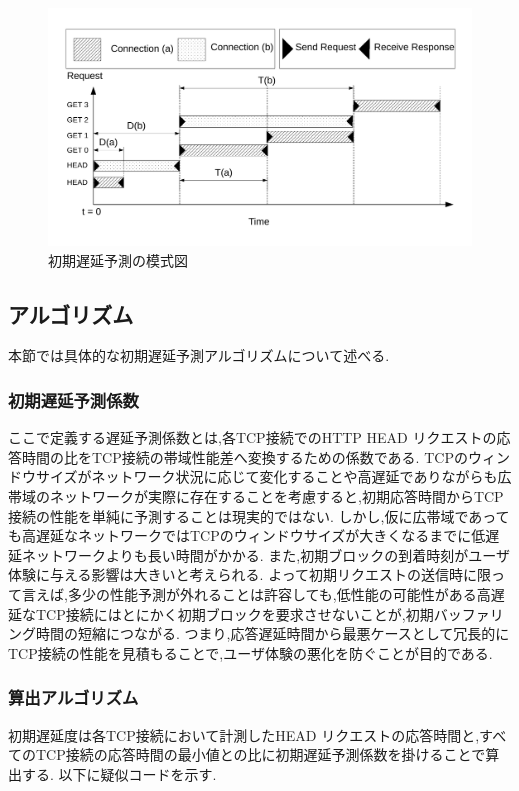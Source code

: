 \documentclass[a4j,12pt]{gradthesis_utf8}
\begin{document}
\begin{figure}[ht]
	\centering
	\includegraphics[width=14cm]{figure/head.pdf}
	\caption{初期遅延予測の模式図}
	\label{head}
\end{figure}

\newpage

\subsection{アルゴリズム}
\label{yosokuhouhou}
本節では具体的な初期遅延予測アルゴリズムについて述べる.

\subsubsection{初期遅延予測係数}
ここで定義する遅延予測係数とは,各TCP接続でのHTTP HEAD リクエストの応答時間の比をTCP接続の帯域性能差へ変換するための係数である.
TCPのウィンドウサイズがネットワーク状況に応じて変化することや高遅延でありながらも広帯域のネットワークが実際に存在することを考慮すると,初期応答時間からTCP接続の性能を単純に予測することは現実的ではない.
しかし,仮に広帯域であっても高遅延なネットワークではTCPのウィンドウサイズが大きくなるまでに低遅延ネットワークよりも長い時間がかかる.
また,初期ブロックの到着時刻がユーザ体験に与える影響は大きいと考えられる.
よって初期リクエストの送信時に限って言えば,多少の性能予測が外れることは許容しても,低性能の可能性がある高遅延なTCP接続にはとにかく初期ブロックを要求させないことが,初期バッファリング時間の短縮につながる.
つまり,応答遅延時間から最悪ケースとして冗長的にTCP接続の性能を見積もることで,ユーザ体験の悪化を防ぐことが目的である.

\subsubsection{算出アルゴリズム}
初期遅延度は各TCP接続において計測したHEAD リクエストの応答時間と,すべてのTCP接続の応答時間の最小値との比に初期遅延予測係数を掛けることで算出する.
以下に疑似コードを示す.
\end{document}

